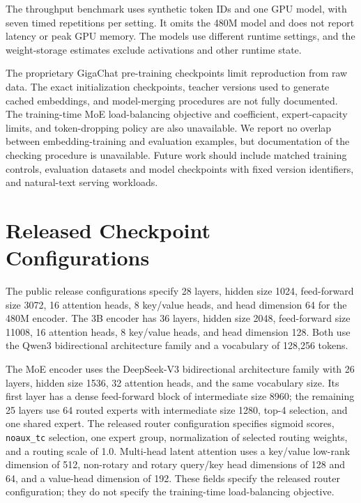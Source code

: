 \documentclass[11pt]{article}
\begin{document}
The throughput benchmark uses synthetic token IDs and one GPU model, with seven timed repetitions per setting.
It omits the 480M model and does not report latency or peak GPU memory.
The models use different runtime settings, and the weight-storage estimates exclude activations and other runtime state.

The proprietary GigaChat pre-training checkpoints limit reproduction from raw data.
The exact initialization checkpoints, teacher versions used to generate cached embeddings, and model-merging procedures are not fully documented.
The training-time MoE load-balancing objective and coefficient, expert-capacity limits, and token-dropping policy are also unavailable.
We report no overlap between embedding-training and evaluation examples, but documentation of the checking procedure is unavailable.
Future work should include matched training controls, evaluation datasets and model checkpoints with fixed version identifiers, and natural-text serving workloads.

\FloatBarrier


\appendix
\section{Released Checkpoint Configurations}
\label{app:config}

The public release configurations specify 28 layers, hidden size 1024, feed-forward size 3072, 16 attention heads, 8 key/value heads, and head dimension 64 for the 480M encoder.
The 3B encoder has 36 layers, hidden size 2048, feed-forward size 11008, 16 attention heads, 8 key/value heads, and head dimension 128.
Both use the Qwen3 bidirectional architecture family and a vocabulary of 128,256 tokens.

The MoE encoder uses the DeepSeek-V3 bidirectional architecture family with 26 layers, hidden size 1536, 32 attention heads, and the same vocabulary size.
Its first layer has a dense feed-forward block of intermediate size 8960; the remaining 25 layers use 64 routed experts with intermediate size 1280, top-4 selection, and one shared expert.
The released router configuration specifies sigmoid scores, \texttt{noaux\_tc} selection, one expert group, normalization of selected routing weights, and a routing scale of 1.0.
Multi-head latent attention uses a key/value low-rank dimension of 512, non-rotary and rotary query/key head dimensions of 128 and 64, and a value-head dimension of 192.
These fields specify the released router configuration; they do not specify the training-time load-balancing objective.
\end{document}

